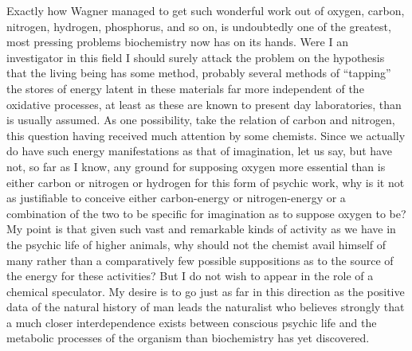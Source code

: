 \documentclass[a4paper, 11pt, oneside, polutonikogreek, english]{article}
\begin{document}
Exactly how Wagner managed to get such wonderful work out of oxygen, carbon, nitrogen, hydrogen, phosphorus, and so on, is undoubtedly one of the greatest, most pressing problems biochemistry now has on its hands. Were I an investigator in this field I should surely attack the problem on the hypothesis that the living being has some method, probably several methods of ``tapping'' the stores of energy latent in these materials far more independent of the oxidative processes, at least as these are known to present day laboratories, than is usually assumed. As one possibility, take the relation of carbon and nitrogen, this question having received much attention by some chemists. Since we actually do have such energy manifestations as that of imagination, let us say, but have not, so far as I know, any ground for supposing oxygen more essential than is either carbon or nitrogen or hydrogen for this form of psychic work, why is it not as justifiable to conceive either carbon-energy or nitrogen-energy or a combination of the two to be specific for imagination as to suppose oxygen to be? My point is that given such vast and remarkable kinds of activity as we have in the psychic life of higher animals, why should not the chemist avail himself of many rather than a comparatively few possible suppositions as to the source of the energy for these activities? But I do not wish to appear in the role of a chemical speculator. My desire is to go just as far in this direction as the positive data of the natural history of man leads the naturalist who believes strongly that a much closer interdependence exists between conscious psychic life and the metabolic processes of the organism than biochemistry has yet discovered.

\subsection{}
\end{document}

